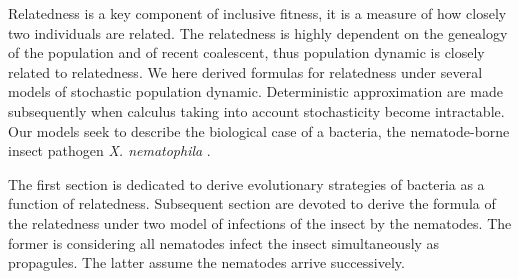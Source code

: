 \documentclass[10pt]{article}
\newcommand{\Xnema}{\textit{X. nematophila} }
\begin{document}
\begin{multicols}{2}
Relatedness is a key component of inclusive fitness, it is a measure of how closely two individuals are related. The relatedness is highly dependent on the genealogy of the population and of recent coalescent, thus population dynamic is closely related to relatedness. We here derived formulas for relatedness under several models of stochastic population dynamic. Deterministic approximation are made subsequently when calculus taking into account stochasticity become intractable. Our models seek to describe the biological case of a bacteria, the nematode-borne insect pathogen \Xnema.

The first section is dedicated to derive evolutionary strategies of bacteria as a function of relatedness. Subsequent section are devoted to derive the formula of the relatedness under two  model of infections of the insect by the nematodes. The former is considering all nematodes infect the insect simultaneously as propagules. The latter assume the nematodes arrive successively.


\end{multicols}
\end{document}
